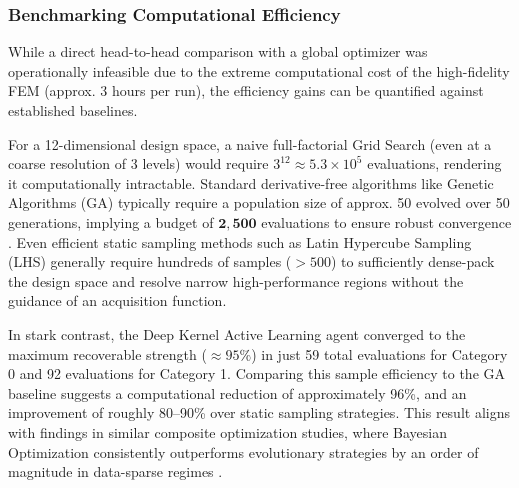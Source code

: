\documentclass[
  preprint,
  12pt,
  a4paper
]{elsarticle}
\begin{document}
\subsubsection{Benchmarking Computational Efficiency}
While a direct head-to-head comparison with a global optimizer was operationally infeasible due to the extreme computational cost of the high-fidelity FEM (approx. 3 hours per run), the efficiency gains can be quantified against established baselines. 

For a 12-dimensional design space, a naive full-factorial Grid Search (even at a coarse resolution of 3 levels) would require $3^{12} \approx 5.3 \times 10^5$ evaluations, rendering it computationally intractable. Standard derivative-free algorithms like Genetic Algorithms (GA) typically require a population size of approx. 50 evolved over 50 generations, implying a budget of $\mathbf{2,500}$ evaluations to ensure robust convergence \cite{queipo2005surrogate}. Even efficient static sampling methods such as Latin Hypercube Sampling (LHS) generally require hundreds of samples ($>500$) to sufficiently dense-pack the design space and resolve narrow high-performance regions without the guidance of an acquisition function.

In stark contrast, the Deep Kernel Active Learning agent converged to the maximum recoverable strength ($\approx 95\%$) in just 59 total evaluations for Category 0 and 92 evaluations for Category 1. Comparing this sample efficiency to the GA baseline suggests a computational reduction of approximately 96\%, and an improvement of roughly 80--90\% over static sampling strategies. This result aligns with findings in similar composite optimization studies, where Bayesian Optimization consistently outperforms evolutionary strategies by an order of magnitude in data-sparse regimes \cite{ghosh2023digital}.
\end{document}
